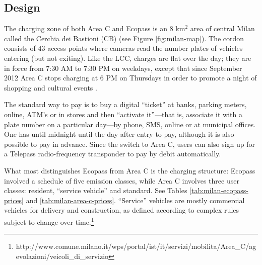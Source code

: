 \subsection{Design}

The charging zone of both Area C and Ecopass is an 8 km$^{2}$ area of central Milan called the Cerchia dei Bastioni (CB) (see Figure \ref{fig:milan-map}). The cordon consists of 43 access points where cameras read the number plates of vehicles entering (but not exiting). Like the LCC, charges are flat over the day; they are in force from 7:30 AM to 7:30 PM on weekdays, except that since September 2012 Area C stops charging at 6 PM on Thursdays in order to promote a night of shopping and cultural events \citep{CorriereDellaSera2012}. 

The standard way to pay is to buy a digital ``ticket'' at banks, parking meters, online, ATM's or in stores and then ``activate it''---that is, associate it with a plate number on a particular day---by phone, SMS, online or at municipal offices. One has until midnight until the day after entry to pay, although it is also possible to pay in advance. Since the switch to Area C, users can also sign up for a Telepass radio-frequency transponder to pay by debit automatically. 

What most distinguishes Ecopass from Area C is the charging structure: Ecopass involved a schedule of five emission classes, while Area C involves three user classes: resident, ``service vehicle'' and standard. See Tables \ref{tab:milan-ecopass-prices} and \ref{tab:milan-area-c-prices}. ``Service'' vehicles are mostly commercial vehicles for delivery and construction, as defined according to complex rules subject to change over time.\footnote{http://www.comune.milano.it/wps/portal/ist/it/servizi/mobilita/Area\_C/agevolazioni/veicoli\_di\_servizio} 

